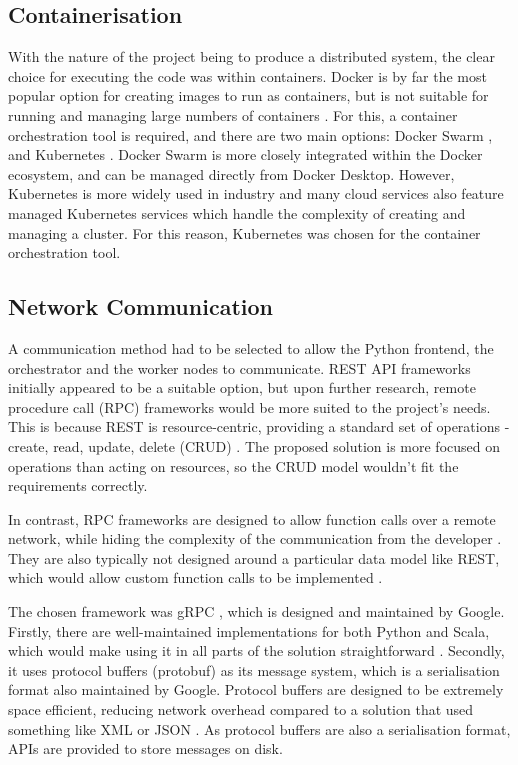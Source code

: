\subsection{Containerisation}
With the nature of the project being to produce a distributed system, the clear choice for executing the code was within containers. Docker  is by far the most popular option for creating images to run as containers, but is not suitable for running and managing large numbers of containers . For this, a container orchestration tool is required, and there are two main options: Docker Swarm , and Kubernetes . Docker Swarm is more closely integrated within the Docker ecosystem, and can be managed directly from Docker Desktop. However, Kubernetes is more widely used in industry  and many cloud services also feature  managed Kubernetes services which handle the complexity of creating and managing a cluster. For this reason, Kubernetes was chosen for the container orchestration tool.

\subsection{Network Communication} 
A communication method had to be selected to allow the Python frontend, the orchestrator and the worker nodes to communicate. REST API frameworks initially appeared to be a suitable option, but upon further research, remote procedure call (RPC) frameworks would be more suited to the project's needs. This is because REST is resource-centric, providing a standard set of operations - create, read, update, delete (CRUD) . The proposed solution is more focused on operations than acting on resources, so the CRUD model wouldn't fit the requirements correctly. 

In contrast, RPC frameworks are designed to allow function calls over a remote network, while hiding the complexity of the communication from the developer . They are also typically not designed around a particular data model like REST, which would allow custom function calls to  be implemented . 

The chosen framework was gRPC , which is designed and maintained by Google. Firstly, there are well-maintained implementations for both Python and Scala, which would make using it in all parts of the solution straightforward . Secondly, it uses protocol buffers (protobuf)  as its message system, which is a serialisation format also maintained by Google. Protocol buffers are designed to be extremely space efficient, reducing network overhead compared to a solution that used something like XML or JSON . As protocol buffers are also a serialisation format, APIs are provided to store messages on disk.


